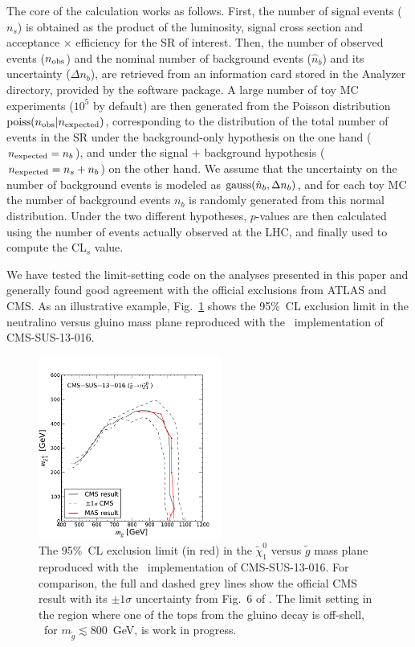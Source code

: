 The core of the calculation works as follows. First, the number of signal events ($n_s$) is obtained as the
product of the luminosity, signal cross section and acceptance $\times$ efficiency for the SR of interest.
Then, the number of observed events ($n_{\rm obs}$) and the nominal number of background
events ($\hat n_b$) and its uncertainty ($\Delta n_b$), are retrieved from an information card stored in the Analyzer directory, provided by the software package.
A large number of toy MC experiments ($10^5$ by default) are then generated from the Poisson distribution
${\rm poiss}(n_{\rm obs} | n_{\rm expected})$, 
corresponding to the distribution of the total number of events in the SR under the
background-only hypothesis on the one hand ($n_{\rm expected} = n_b$), and under the
signal $+$ background hypothesis ($n_{\rm expected} = n_s + n_b$) on the other hand.
We assume that the uncertainty on the number of background events is modeled as ${\rm gauss}(\hat n_b, \Delta n_b)$,
and for each toy MC the number of background events $n_b$ is randomly generated from this normal distribution.
Under the two different hypotheses, $p$-values are then calculated using the number of events actually observed at the LHC, and finally used to compute the CL$_s$ value.

We have tested the limit-setting code on the analyses presented in this paper and generally found good agreement with the official exclusions from ATLAS and CMS.
As an illustrative example, Fig.~\ref{fig:cms-016-limit} shows the 95\%~CL exclusion limit in the neutralino versus gluino mass plane reproduced with the \ma\ implementation \cite{MA5-CMS-SUS-13-016}  of CMS-SUS-13-016.  

\begin{figure}[!h]\centering
\includegraphics[width=6cm]{figures/madanalysis5/cms-016-limit.pdf}
\caption{The 95\%~CL exclusion limit (in red) in the $\tilde\chi^0_1$ versus $\tilde g$ mass plane reproduced 
with the \ma\ implementation  \cite{MA5-CMS-SUS-13-016}  of CMS-SUS-13-016. For comparison, the full and dashed grey lines show the official CMS result with its $\pm1\sigma$ uncertainty from Fig.~6 of \cite{CMS:2013ija}. 
The limit setting in the region where one of the tops from the gluino decay is off-shell, \ie\ for $m_{\tilde g}\lesssim 800$~GeV, is work in progress.} 
\label{fig:cms-016-limit}
\end{figure}


